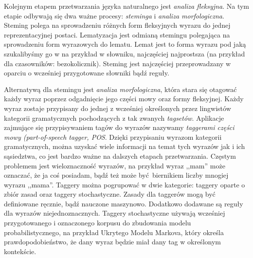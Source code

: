 \documentclass[a4paper, twoside, 12pt]{report}
\begin{document}
            Kolejnym etapem przetwarzania języka naturalnego jest \emph{analiza fleksyjna}. Na tym etapie odbywają się dwa
            ważne procesy: \emph{steminga} i \emph{analiza morfologiczna}. Steming polega na sprowadzeniu różnych form fleksyjnych wyrazu do jednej
            reprezentacyjnej postaci. Lematyzacja jest odmianą stemingu polegająca na sprowadzeniu form wyrazowych do lematu.
            Lemat jest to forma wyrazu pod jaką szukalibyśmy go w na przykład w słowniku, najczęściej najprostsza
            (na przykład dla czasowników: bezokolicznik). Steming jest najczęściej przeprowadzany w oparciu o wcześniej
            przygotowane słowniki bądź reguły.

            Alternatywą dla stemingu jest \emph{analiza morfologiczna}, która stara się otagować każdy wyraz poprzez odgadnięcie
            jego części mowy oraz formy fleksyjnej. Każdy wyraz zostaje przypisany do jednej z wcześniej określonych
            przez lingwistów kategorii gramatycznych pochodzących z tak zwanych \emph{tagsetów}. Aplikacje zajmujące
            się przypisywaniem tagów do wyrazów nazywamy \emph{taggerami części mowy (part-of-speech tagger, POS}. Dzięki przypisaniu
            wyrazom kategorii gramatycznych, można uzyskać wiele informacji na temat tych wyrazów jak i ich sąsiedztwa,
            co jest bardzo ważne na dalszych etapach przetwarzania. Częstym problemem jest wieloznaczność wyrazów, na przykład
            wyraz ,,mam'' może oznaczać, że ja coś posiadam, bądź też może być biernikiem liczby mnogiej wyrazu ,,mama''.
            Taggery można pogrupować w dwie kategorie: taggery oparte o zbiór zasad oraz taggery stochastyczne. Zasady
            dla taggerów mogą być definiowane ręcznie, bądź nauczone maszynowo. Dodatkowo dodawane są reguły dla wyrazów
            niejednoznacznych. Taggery stochastyczne używają wcześniej przygotowanego i oznaczonego korpusu do zbudowania
            modelu probabilistycznego, na przykład Ukrytego Modelu Markova, który określa prawdopodobieństwo, że dany
            wyraz będzie miał dany tag w określonym kontekście\cite{SPEECHANDLANGUAGEPROCESSING}.
\end{document}
